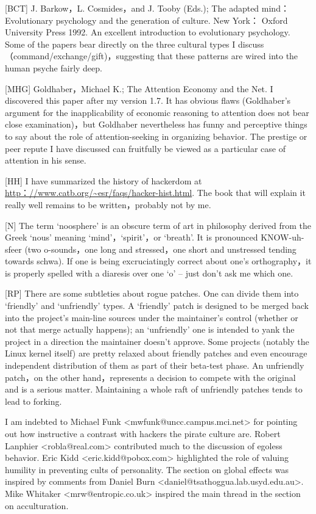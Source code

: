 [BCT] J. Barkow，L. Cosmides，and J. Tooby (Eds.); The adapted mind： Evolutionary psychology and the generation of culture. New York： Oxford University Press 1992. An excellent introduction to evolutionary psychology. Some of the papers bear directly on the three cultural types I discuss （command/exchange/gift)，suggesting that these patterns are wired into the human psyche fairly deep.

[MHG] Goldhaber，Michael K.; The Attention Economy and the Net. I discovered this paper after my version 1.7. It has obvious flaws (Goldhaber's argument for the inapplicability of economic reasoning to attention does not bear close examination)，but Goldhaber nevertheless has funny and perceptive things to say about the role of attention-seeking in organizing behavior. The prestige or peer repute I have discussed can fruitfully be viewed as a particular case of attention in his sense.

[HH] I have summarized the history of hackerdom at \url{http：//www.catb.org/~esr/faqs/hacker-hist.html}. The book that will explain it really well remains to be written，probably not by me.

[N] The term `noosphere' is an obscure term of art in philosophy derived from the Greek `nous' meaning `mind'，`spirit'，or `breath'. It is pronounced KNOW-uh-sfeer (two o-sounds，one long and stressed，one short and unstressed tending towards schwa). If one is being excruciatingly correct about one's orthography，it is properly spelled with a diaresis over one `o' -- just don't ask me which one.

[RP] There are some subtleties about rogue patches. One can divide them into `friendly' and `unfriendly' types. A `friendly' patch is designed to be merged back into the project's main-line sources under the maintainer's control (whether or not that merge actually happens); an `unfriendly' one is intended to yank the project in a direction the maintainer doesn't approve. Some projects (notably the Linux kernel itself) are pretty relaxed about friendly patches and even encourage independent distribution of them as part of their beta-test phase. An unfriendly patch，on the other hand，represents a decision to compete with the original and is a serious matter. Maintaining a whole raft of unfriendly patches tends to lead to forking.

I am indebted to Michael Funk <mwfunk@uncc.campus.mci.net> for pointing out how instructive a contrast with hackers the pirate culture are. Robert Lanphier <robla@real.com> contributed much to the discussion of egoless behavior. Eric Kidd <eric.kidd@pobox.com> highlighted the role of valuing humility in preventing cults of personality. The section on global effects was inspired by comments from Daniel Burn <daniel@tsathoggua.lab.usyd.edu.au>. Mike Whitaker <mrw@entropic.co.uk> inspired the main thread in the section on acculturation.

